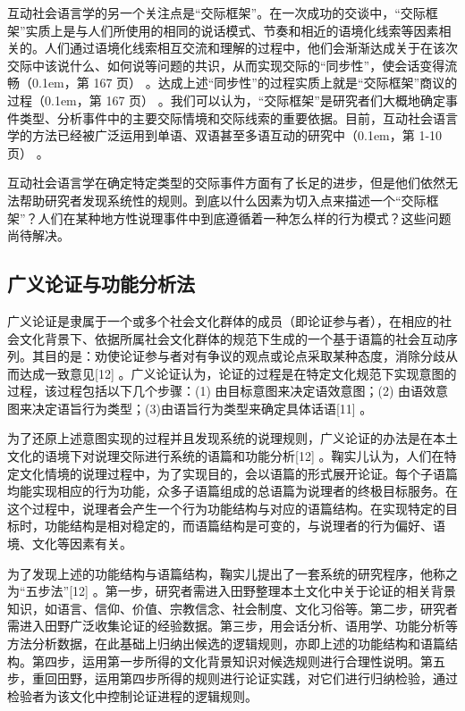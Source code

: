 \documentclass[b5paper,10.5pt,onecolumn,twoside,leqno,UTF8]{article}
\newcommand{\pcr}[1]{\raise0.1em\hbox{\parencite{#1}}}
\newcommand{\pc}[2]{（\pcr{#1}，第 #2 页）}
\begin{document}
互动社会语言学的另一个关注点是“交际框架”。在一次成功的交谈中，“交际框架”实质上是与人们所使用的相同的说话模式、节奏和相近的语境化线索等因素相关的。人们通过语境化线索相互交流和理解的过程中，他们会渐渐达成关于在该次交际中该说什么、如何说等问题的共识，从而实现交际的“同步性”，使会话变得流畅\pc{Gumperz, J.J.1982}{167} 。达成上述“同步性”的过程实质上就是“交际框架”商议的过程\pc{Gumperz, J.J.1982}{167} 。我们可以认为，“交际框架”是研究者们大概地确定事件类型、分析事件中的主要交际情境和交际线索的重要依据。目前，互动社会语言学的方法已经被广泛运用到单语、双语甚至多语互动的研究中\pc{Gumperz, J.J.2003}{1-10} 。

互动社会语言学在确定特定类型的交际事件方面有了长足的进步，但是他们依然无法帮助研究者发现系统性的规则。到底以什么因素为切入点来描述一个“交际框架”？人们在某种地方性说理事件中到底遵循着一种怎么样的行为模式？这些问题尚待解决。

\subsection{广义论证与功能分析法}

广义论证是隶属于一个或多个社会文化群体的成员（即论证参与者），在相应的社会文化背景下、依据所属社会文化群体的规范下生成的一个基于语篇的社会互动序列。其目的是：劝使论证参与者对有争议的观点或论点采取某种态度，消除分歧从而达成一致意见[12] 。广义论证认为，论证的过程是在特定文化规范下实现意图的过程，该过程包括以下几个步骤：(1) 由目标意图来决定语效意图；(2) 由语效意图来决定语旨行为类型；(3)由语旨行为类型来确定具体话语[11] 。

为了还原上述意图实现的过程并且发现系统的说理规则，广义论证的办法是在本土文化的语境下对说理交际进行系统的语篇和功能分析[12] 。鞠实儿认为，人们在特定文化情境的说理过程中，为了实现目的，会以语篇的形式展开论证。每个子语篇均能实现相应的行为功能，众多子语篇组成的总语篇为说理者的终极目标服务。在这个过程中，说理者会产生一个行为功能结构与对应的语篇结构。在实现特定的目标时，功能结构是相对稳定的，而语篇结构是可变的，与说理者的行为偏好、语境、文化等因素有关。

为了发现上述的功能结构与语篇结构，鞠实儿提出了一套系统的研究程序，他称之为“五步法”[12] 。第一步，研究者需进入田野整理本土文化中关于论证的相关背景知识，如语言、信仰、价值、宗教信念、社会制度、文化习俗等。第二步，研究者需进入田野广泛收集论证的经验数据。第三步，用会话分析、语用学、功能分析等方法分析数据，在此基础上归纳出候选的逻辑规则，亦即上述的功能结构和语篇结构。第四步，运用第一步所得的文化背景知识对候选规则进行合理性说明。第五步，重回田野，运用第四步所得的规则进行论证实践，对它们进行归纳检验，通过检验者为该文化中控制论证进程的逻辑规则。
\end{document}
